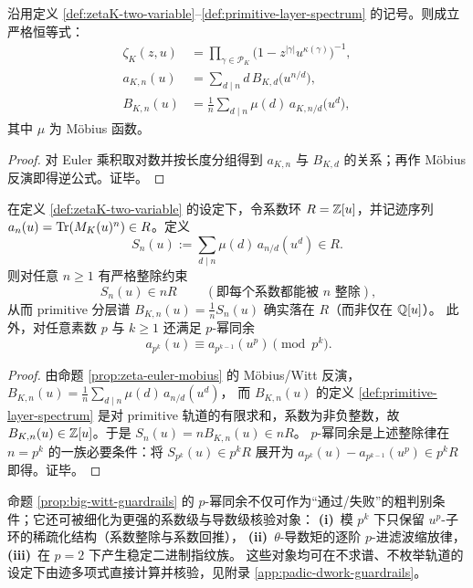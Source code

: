 \begin{proposition}\label{prop:zeta-euler-mobius}
沿用定义 \ref{def:zetaK-two-variable}--\ref{def:primitive-layer-spectrum} 的记号。则成立严格恒等式：
\begin{align*}
\zeta_K(z,u)
&=\prod_{\gamma\in\mathcal{P}_K}\bigl(1-z^{|\gamma|}u^{\kappa(\gamma)}\bigr)^{-1},\\
a_{K,n}(u)
&=\sum_{d\mid n} d\,B_{K,d}\!\bigl(u^{n/d}\bigr),\\
B_{K,n}(u)
&=\frac{1}{n}\sum_{d\mid n}\mu(d)\,a_{K,n/d}\!\bigl(u^d\bigr),
\end{align*}
其中 $\mu$ 为 Möbius 函数。
\end{proposition}
\begin{proof}
对 Euler 乘积取对数并按长度分组得到 $a_{K,n}$ 与 $B_{K,d}$ 的关系；再作 Möbius 反演即得逆公式。证毕。
\end{proof}

\begin{proposition}\label{prop:big-witt-guardrails}
在定义 \ref{def:zetaK-two-variable} 的设定下，令系数环 $R=\mathbb{Z}[u]$，并记迹序列 $a_n(u)=\mathrm{Tr}(M_K(u)^n)\in R$。定义
$$
S_n(u):=\sum_{d\mid n}\mu(d)\,a_{n/d}(u^d)\in R.
$$
则对任意 $n\ge 1$ 有严格整除约束
$$
\boxed{\ S_n(u)\in nR\ } \qquad(\text{即每个系数都能被 }n\text{ 整除}),
$$
从而 primitive 分层谱
$
B_{K,n}(u)=\frac{1}{n}S_n(u)
$
确实落在 $R$（而非仅在 $\mathbb{Q}[u]$）。
此外，对任意素数 $p$ 与 $k\ge 1$ 还满足 $p$-幂同余
$$
\boxed{\ a_{p^k}(u)\equiv a_{p^{k-1}}(u^p)\pmod{p^k} }.
$$
\end{proposition}
\begin{proof}
由命题 \ref{prop:zeta-euler-mobius} 的 Möbius/Witt 反演，
$
B_{K,n}(u)=\frac{1}{n}\sum_{d\mid n}\mu(d)\,a_{n/d}(u^d)
$，
而 $B_{K,n}(u)$ 的定义 \eqref{def:primitive-layer-spectrum} 是对 primitive 轨道的有限求和，系数为非负整数，故 $B_{K,n}(u)\in\mathbb{Z}[u]$。于是 $S_n(u)=nB_{K,n}(u)\in nR$。
$p$-幂同余是上述整除律在 $n=p^k$ 的一族必要条件：将 $S_{p^k}(u)\in p^kR$ 展开为
$
a_{p^k}(u)-a_{p^{k-1}}(u^p)\in p^kR
$
即得。证毕。
\end{proof}

\begin{remark}\label{rem:padic-dwork-guardrails}
命题 \ref{prop:big-witt-guardrails} 的 \(p\)-幂同余不仅可作为“通过/失败”的粗判别条件；它还可被细化为更强的系数级与导数级核验对象：
\textbf{(i)}~模 \(p^k\) 下只保留 \(u^p\)-子环的稀疏化结构（系数整除与系数回推），
\textbf{(ii)}~\(\theta\)-导数矩的逐阶 \(p\)-进滤波缩放律，
\textbf{(iii)}~在 \(p=2\) 下产生稳定二进制指纹族。
这些对象均可在不求谱、不枚举轨道的设定下由迹多项式直接计算并核验，见附录 \ref{app:padic-dwork-guardrails}。
\end{remark}

